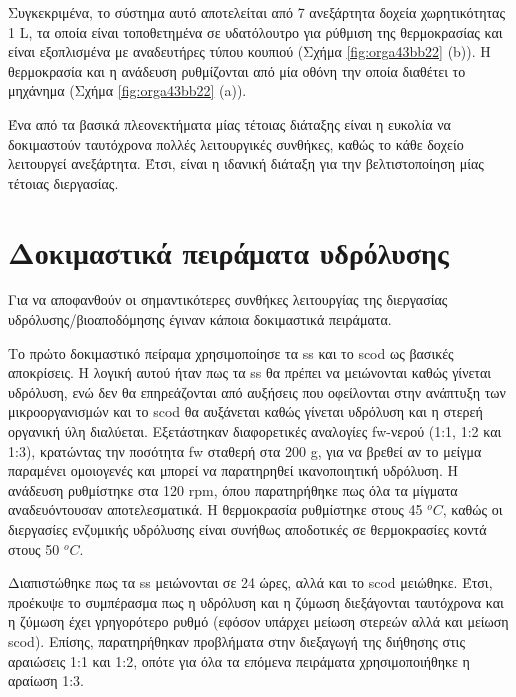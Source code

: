 \documentclass[11pt]{report}
\begin{document}
Συγκεκριμένα, το σύστημα αυτό αποτελείται από 7 ανεξάρτητα δοχεία χωρητικότητας 1 L, τα οποία είναι τοποθετημένα σε υδατόλουτρο για ρύθμιση της θερμοκρασίας και είναι εξοπλισμένα με αναδευτήρες τύπου κουπιού (Σχήμα \ref{fig:orga43bb22} (b)). Η θερμοκρασία και η ανάδευση ρυθμίζονται από μία οθόνη την οποία διαθέτει το μηχάνημα (Σχήμα \ref{fig:orga43bb22} (a)). 

Ένα από τα βασικά πλεονεκτήματα μίας τέτοιας διάταξης είναι η ευκολία να δοκιμαστούν ταυτόχρονα πολλές λειτουργικές συνθήκες, καθώς το κάθε δοχείο λειτουργεί ανεξάρτητα. Έτσι, είναι η ιδανική διάταξη για την βελτιστοποίηση μίας τέτοιας διεργασίας.

\section{Δοκιμαστικά πειράματα υδρόλυσης}
\label{sec:org30f3106}
\label{sec:prep-hydro}

Για να αποφανθούν οι σημαντικότερες συνθήκες λειτουργίας της διεργασίας υδρόλυσης/βιοαποδόμησης έγιναν κάποια δοκιμαστικά πειράματα.

Το πρώτο δοκιμαστικό πείραμα χρησιμοποίησε τα \acrfull{ss} και το \acrfull{scod} ως βασικές αποκρίσεις. Η λογική αυτού ήταν πως τα \acrshort{ss} θα πρέπει να μειώνονται καθώς γίνεται υδρόλυση, ενώ δεν θα επηρεάζονται από αυξήσεις που οφείλονται στην ανάπτυξη των μικροοργανισμών και το \acrshort{scod} θα αυξάνεται καθώς γίνεται υδρόλυση και η στερεή οργανική ύλη διαλύεται. Εξετάστηκαν διαφορετικές αναλογίες \acrshort{fw}-νερού (1:1, 1:2 και 1:3), κρατώντας την ποσότητα \acrshort{fw} σταθερή στα 200 g, για να βρεθεί αν το μείγμα παραμένει ομοιογενές και μπορεί να παρατηρηθεί ικανοποιητική υδρόλυση. Η ανάδευση ρυθμίστηκε στα 120 rpm, όπου παρατηρήθηκε πως όλα τα μίγματα αναδευόντουσαν αποτελεσματικά. Η θερμοκρασία ρυθμίστηκε στους 45 \(^oC\), καθώς οι διεργασίες ενζυμικής υδρόλυσης είναι συνήθως αποδοτικές σε θερμοκρασίες κοντά στους 50 \(^oC\). 

Διαπιστώθηκε πως τα \acrfull{ss} μειώνονται σε 24 ώρες, αλλά και το \acrshort{scod} μειώθηκε. Έτσι, προέκυψε το συμπέρασμα πως η υδρόλυση και η ζύμωση διεξάγονται ταυτόχρονα και η ζύμωση έχει γρηγορότερο ρυθμό (εφόσον υπάρχει μείωση στερεών αλλά και μείωση \acrshort{scod}). Επίσης, παρατηρήθηκαν προβλήματα στην διεξαγωγή της διήθησης στις αραιώσεις 1:1 και 1:2, οπότε για όλα τα επόμενα πειράματα χρησιμοποιήθηκε η αραίωση 1:3.
\end{document}
